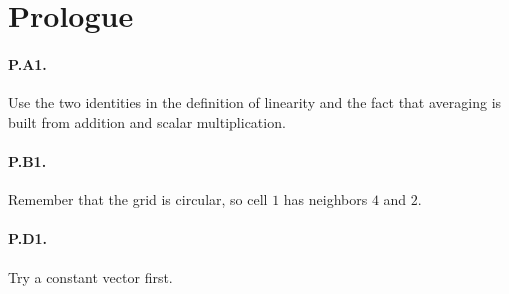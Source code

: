 \section*{Prologue}

\paragraph{P.A1.}
Use the two identities in the definition of linearity and the fact that
averaging is built from addition and scalar multiplication.

\paragraph{P.B1.}
Remember that the grid is circular, so cell $1$ has neighbors $4$ and $2$.

\paragraph{P.D1.}
Try a constant vector first.

